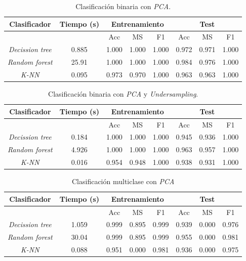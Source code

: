 \begin{table}[th]
	\centering
	\begin{tabular}{ |c|c|c|c|c|c|c|c| }
		\hline
		\rowcolor{LightCyan}
		Clasificador & Tiempo (s) & \multicolumn{3}{c|}{Entrenamiento} & \multicolumn{3}{c|}{Test} \\
		\hline
		\rowcolor{LightCyan}
		&            & Acc & MS & F1 & Acc & MS & F1 \\
		\hline
		\textit{Decission tree} & 0.885 & 1.000 & 1.000 & 1.000 & 0.972 & 0.971 & 1.000 \\
		\textit{Random forest}  & 25.91 & 1.000 & 1.000 & 1.000 & 0.984 & 0.976 & 1.000 \\
		\textit{K-NN}           & 0.095 & 0.973 & 0.970 & 1.000 & 0.963 & 0.963 & 1.000 \\
		\hline
	\end{tabular}
	\caption{Clasificación binaria con \textit{PCA}.}
	\label{tabla:binary_pca}
\end{table}

\begin{table}[th]
	\centering
	\begin{tabular}{ |c|c|c|c|c|c|c|c| }
		\hline
		\rowcolor{LightCyan}
		Clasificador & Tiempo (s) & \multicolumn{3}{c|}{Entrenamiento} & \multicolumn{3}{c|}{Test} \\
		\hline
		\rowcolor{LightCyan}
		&            & Acc & MS & F1 & Acc & MS & F1 \\
		\hline
		\textit{Decission tree} & 0.184 & 1.000 & 1.000 & 1.000 & 0.945 & 0.936 & 1.000 \\
		\textit{Random forest}  & 4.926 & 1.000 & 1.000 & 1.000 & 0.963 & 0.957 & 1.000 \\
		\textit{K-NN}           & 0.016 & 0.954 & 0.948 & 1.000 & 0.938 & 0.931 & 1.000 \\
		\hline
	\end{tabular}
	\caption{Clasificación binaria con \textit{PCA} y \textit{Undersampling}.}
	\label{tabla:binary_under}
\end{table}

\begin{table}[th]
	\centering
	\begin{tabular}{ |c|c|c|c|c|c|c|c| }
		\hline
		\rowcolor{LightCyan}
		Clasificador & Tiempo (s) & \multicolumn{3}{c|}{Entrenamiento} & \multicolumn{3}{c|}{Test} \\
		\hline
		\rowcolor{LightCyan}
		& & Acc & MS & F1 & Acc & MS & F1 \\
		\hline
		\textit{Decission tree} & 1.059 & 0.999 & 0.895 & 0.999 & 0.939 & 0.000 & 0.976 \\
		\textit{Random forest}  & 30.04 & 0.999 & 0.895 & 0.999 & 0.955 & 0.000 & 0.981 \\
		\textit{K-NN}           & 0.088 & 0.951 & 0.000 & 0.981 & 0.936 & 0.000 & 0.975 \\
		\hline
	\end{tabular}
	\caption{Clasificación multiclase con \textit{PCA}}
	\label{tabla:multi_pca}
\end{table}

